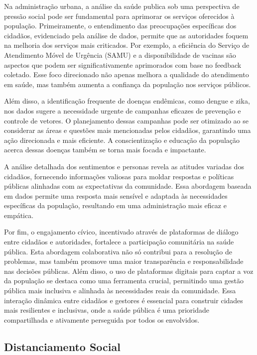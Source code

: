 Na administração urbana, a análise da saúde publica sob uma perspectiva de pressão social pode ser fundamental para aprimorar os serviços oferecidos à população. Primeiramente, o entendimento das preocupações específicas dos cidadãos, evidenciado pela análise de dados, permite que as autoridades foquem na melhoria dos serviços mais criticados. Por exemplo, a eficiência do Serviço de Atendimento Móvel de Urgência (SAMU) e a disponibilidade de vacinas são aspectos que podem ser significativamente aprimorados com base no feedback coletado. Esse foco direcionado não apenas melhora a qualidade do atendimento em saúde, mas também aumenta a confiança da população nos serviços públicos.

Além disso, a identificação frequente de doenças endêmicas, como dengue e zika, nos dados sugere a necessidade urgente de campanhas eficazes de prevenção e controle de vetores. O planejamento dessas campanhas pode ser otimizado ao se considerar as áreas e questões mais mencionadas pelos cidadãos, garantindo uma ação direcionada e mais eficiente. A conscientização e educação da população acerca dessas doenças também se torna mais focada e impactante.

A análise detalhada dos sentimentos e personas revela as atitudes variadas dos cidadãos, fornecendo informações valiosas para moldar respostas e políticas públicas alinhadas com as expectativas da comunidade. Essa abordagem baseada em dados permite uma resposta mais sensível e adaptada às necessidades específicas da população, resultando em uma administração mais eficaz e empática.

Por fim, o engajamento cívico, incentivado através de plataformas de diálogo entre cidadãos e autoridades, fortalece a participação comunitária na saúde pública. Esta abordagem colaborativa não só contribui para a resolução de problemas, mas também promove uma maior transparência e responsabilidade nas decisões públicas. Além disso, o uso de plataformas digitais para captar a voz da população se destaca como uma ferramenta crucial, permitindo uma gestão pública mais inclusiva e alinhada às necessidades reais da comunidade. Essa interação dinâmica entre cidadãos e gestores é essencial para construir cidades mais resilientes e inclusivas, onde a saúde pública é uma prioridade compartilhada e ativamente perseguida por todos os envolvidos.

\subsection{Distanciamento Social}

